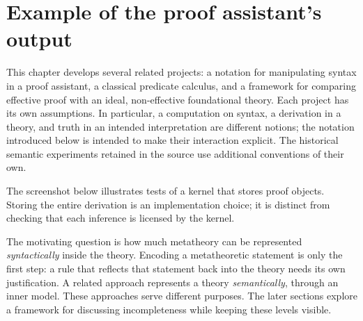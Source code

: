 \def\topic{Chapter: Logic}%


{} 
\section{Example of the proof assistant's output}

This chapter develops several related projects: a notation for manipulating
syntax in a proof assistant, a classical predicate calculus, and a framework
for comparing effective proof with an ideal, non-effective foundational theory.
Each project has its own assumptions. In particular, a computation on syntax,
a derivation in a theory, and truth in an intended interpretation are different
notions; the notation introduced below is intended to make their interaction
explicit. The historical semantic experiments retained in the source use
additional conventions of their own.

The screenshot below illustrates tests of a kernel that stores proof objects.
Storing the entire derivation is an implementation choice; it is distinct from
checking that each inference is licensed by the kernel.

The motivating question is how much metatheory can be represented
\textit{syntactically} inside the theory. Encoding a metatheoretic statement is
only the first step: a rule that reflects that statement back into the theory
needs its own justification. A related approach represents a theory
\textit{semantically}, through an inner model. These approaches serve different
purposes. The later sections explore a framework for discussing incompleteness
while keeping these levels visible.


